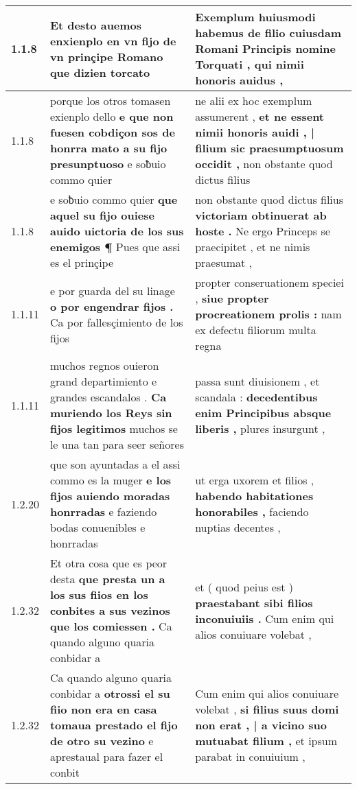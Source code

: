 \begin{tabular}{|p{1cm}|p{6.5cm}|p{6.5cm}|}

\hline
1.1.8 & Et desto auemos \textbf{ enxienplo en vn fijo de vn prinçipe Romano } que dizien torcato & Exemplum huiusmodi habemus \textbf{ de filio cuiusdam Romani Principis nomine Torquati , } qui nimii honoris auidus , \\\hline
1.1.8 & porque los otros tomasen exienplo dello \textbf{ e que non fuesen cobdiçon sos de honrra mato a su fijo presunptuoso } e soƀuio commo quier & ne alii ex hoc exemplum assumerent , \textbf{ et ne essent nimii honoris auidi , | filium sic praesumptuosum occidit , } non obstante quod dictus filius \\\hline
1.1.8 & e soƀuio commo quier \textbf{ que aquel su fijo ouiese auido uictoria de los sus enemigos ¶ } Pues que assi es el prinçipe & non obstante quod dictus filius \textbf{ victoriam obtinuerat ab hoste . } Ne ergo Princeps se praecipitet , et ne nimis praesumat , \\\hline
1.1.11 & e por guarda del su linage \textbf{ o por engendrar fijos . } Ca por fallesçimiento de los fijos & propter conseruationem speciei , \textbf{ siue propter procreationem prolis : } nam ex defectu filiorum multa regna \\\hline
1.1.11 & muchos regnos ouieron grand departimiento e grandes escandalos . \textbf{ Ca muriendo los Reys sin fijos legitimos } muchos se le una tan para seer señores & passa sunt diuisionem , et scandala : \textbf{ decedentibus enim Principibus absque liberis , } plures insurgunt , \\\hline
1.2.20 & que son ayuntadas a el assi commo es la muger \textbf{ e los fijos auiendo moradas honrradas } e faziendo bodas conuenibles e honrradas & ut erga uxorem et filios , \textbf{ habendo habitationes honorabiles , } faciendo nuptias decentes , \\\hline
1.2.32 & Et otra cosa que es peor desta \textbf{ que presta un a los sus fiios en los conbites a sus vezinos que los comiessen . } Ca quando alguno quaria conbidar a & et ( quod peius est ) \textbf{ praestabant sibi filios inconuiuiis . } Cum enim qui alios conuiuare volebat , \\\hline
1.2.32 & Ca quando alguno quaria conbidar a \textbf{ otrossi el su fiio non era en casa tomaua prestado el fijo de otro su vezino } e aprestaual para fazer el conbit & Cum enim qui alios conuiuare volebat , \textbf{ si filius suus domi non erat , | a vicino suo mutuabat filium , } et ipsum parabat in conuiuium , \\\hline

\end{tabular}
